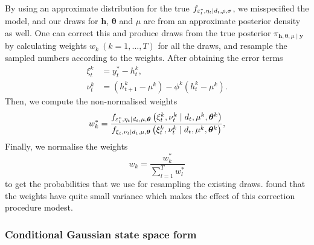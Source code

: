 By using an approximate distribution for the true $f_{\varepsilon_t^\ast,\eta_t\mid d_t,\rho,\sigma}$, we misspecified the model, and our draws for $\bm{h}$, $\bm{\theta}$ and $\mu$ are from an approximate posterior density as well.
One can correct this and produce draws from the true posterior $\pi_{\bm{h},\bm{\theta},\mu\mid\bm{y}}$ by calculating weights $w_k\ (k=1,\dots,T)$ for all the draws, and resample the sampled numbers according to the weights.
After obtaining the error terms
\begin{align*}
\xi_t^k &= y_t^\ast-h_t^k, \\
\nu_t^k &= (h_{t+1}^k-\mu^k)-\phi^k(h_t^k-\mu^k).
\end{align*}
Then, we compute the non-normalised weights
\begin{equation*}
w_k^\ast=\frac{f_{\varepsilon_t^\ast,\eta_t\mid d_t,\mu,\bm\theta}\left(\xi_t^k,\nu_t^k\mid d_t,\mu^k,\bm\theta^k\right)}{f_{\xi_t,\nu_t\mid d_t,\mu,\bm\theta}\left(\xi_t^k,\nu_t^k\mid d_t,\mu^k,\bm\theta^k\right)},
\end{equation*}
Finally, we normalise the weights
\begin{equation*}
w_k=\frac{w_k^\ast}{\sum_{l=1}^{T}w_l^\ast}
\end{equation*}
to get the probabilities that we use for resampling the existing draws.
\citeauthor{Omori2007} found that the weights have quite small variance which makes the effect of this correction procedure modest.

\subsubsection[State space form]{Conditional Gaussian state space form}

